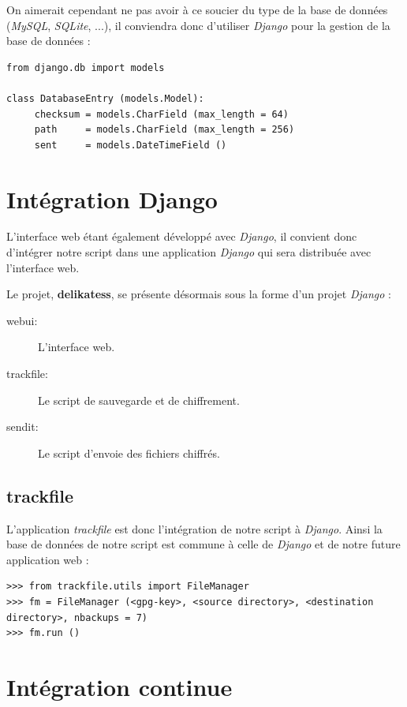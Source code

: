 On aimerait cependant ne pas avoir à ce soucier du type de la base de données (\textit{MySQL}, \textit{SQLite},
...), il conviendra donc d'utiliser \textit{Django} pour la gestion de la base de données :

\begin{verbatim}
from django.db import models

class DatabaseEntry (models.Model):
     checksum = models.CharField (max_length = 64)
     path     = models.CharField (max_length = 256)
     sent     = models.DateTimeField ()
\end{verbatim}

\section{Intégration Django}

L'interface web étant également développé avec \textit{Django}, il convient donc d'intégrer notre script
dans une application \textit{Django} qui sera distribuée avec l'interface web.

Le projet, \textbf{delikatess}, se présente désormais sous la forme d'un projet \textit{Django} :

\begin{description}
     \item[webui:] L'interface web.
     \item[trackfile:] Le script de sauvegarde et de chiffrement.
     \item[sendit:] Le script d'envoie des fichiers chiffrés.
\end{description}

\subsection{trackfile}

L'application \textit{trackfile} est donc l'intégration de notre script à \textit{Django}.
Ainsi la base de données de notre script est commune à celle de \textit{Django} et de notre
future application web :

\begin{verbatim}
>>> from trackfile.utils import FileManager
>>> fm = FileManager (<gpg-key>, <source directory>, <destination directory>, nbackups = 7)
>>> fm.run ()
\end{verbatim}

\section{Intégration continue}

